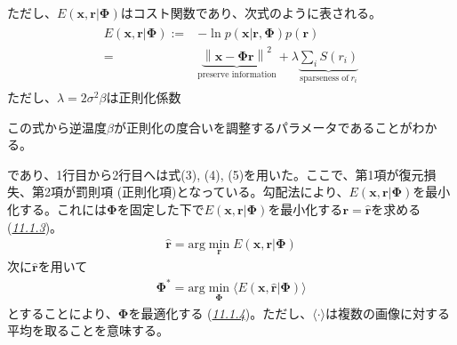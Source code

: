\documentclass[letterpaper,10pt,english]{sphinxmanual}
\begin{document}
ただし、\(E(\mathbf{x}, \mathbf{r}|\mathbf{\Phi})\)はコスト関数であり、次式のように表される。
\begin{equation*}
\begin{split}
\begin{align}
E(\mathbf{x}, \mathbf{r}|\mathbf{\Phi}):=&-\ln p(\mathbf{x}|\mathbf{r}, \mathbf{\Phi})p(\mathbf{r})\\
=&\underbrace{\left\|\mathbf{x}-\mathbf{\Phi} \mathbf{r}\right\|^2}_{\text{preserve information}} + \lambda \underbrace{\sum_i S\left(r_i\right)}_{\text{sparseness of}\ r_i}\tag{9}
\end{align}
\end{split}
\end{equation*}
ただし、\(\lambda=2\sigma^2\beta\)は正則化係数%
\begin{footnote}[2]\sphinxAtStartFootnote
この式から逆温度\(\beta\)が正則化の度合いを調整するパラメータであることがわかる。
%
\end{footnote}であり、1行目から2行目へは式(3), (4), (5)を用いた。ここで、第1項が復元損失、第2項が罰則項 (正則化項)となっている。勾配法により、\(E(\mathbf{x}, \mathbf{r}|\mathbf{\Phi})\)を最小化する。これには\(\mathbf{\Phi}\)を固定した下で\(E(\mathbf{x}, \mathbf{r}|\mathbf{\Phi})\)を最小化する\(\mathbf{r}=\hat{\mathbf{r}}\)を求める ({\hyperref[\detokenize{11-2_sparse-coding:locally-competitive-algorithm-lca}]{\emph{11.1.3}}})。
\begin{equation*}
\begin{split}
\hat{\mathbf{r}}=\text{arg}\min_{\mathbf{r}}E(\mathbf{x}, \mathbf{r}|\mathbf{\Phi})
\end{split}
\end{equation*}
次に\(\hat{\mathbf{r}}\)を用いて
\begin{equation*}
\begin{split}
\mathbf{\Phi}^*=\text{arg}\min_{\mathbf{\Phi}}\langle E(\mathbf{x}, \hat{\mathbf{r}}|\mathbf{\Phi})\rangle
\end{split}
\end{equation*}
とすることにより、\(\mathbf{\Phi}\)を最適化する ({\hyperref[\detokenize{11-2_sparse-coding:id6}]{\emph{11.1.4}}})。ただし、\(\langle\cdot \rangle\)は複数の画像に対する平均を取ることを意味する。
\end{document}
